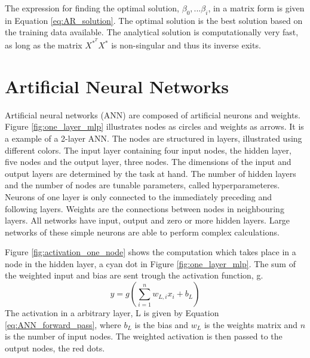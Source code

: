 \documentclass{article}
\begin{document}
The expression for finding the optimal solution, $\beta_0,...\beta_i$, in a matrix form is given in Equation \eqref{eq:AR_solution}. The optimal solution is the best solution based on the training data available. The analytical solution is computationally very fast, as long as the matrix $X^*^TX^*$ is non-singular and thus its inverse exits.

\section{Artificial Neural Networks} \label{sec:artificial neural networks}

Artificial neural networks (ANN) are composed of artificial neurons and weights. Figure \ref{fig:one_layer_mlp} illustrates nodes as circles and weights as arrows. It is a example of a 2-layer ANN. The nodes are structured in layers, illustrated using different colors. The input layer containing four input nodes, the hidden layer, five nodes and the output layer, three nodes. The dimensions of the input and output layers are determined by the task at hand. The number of hidden layers and the number of nodes are tunable parameters, called hyperparameteres. Neurons of one layer is only connected to the immediately preceding and following layers. Weights are the connections between nodes in neighbouring layers. All networks have input, output and zero or more hidden layers. Large networks of these simple neurons are able to perform complex calculations. 

Figure \ref{fig:activation_one_node} shows the computation which takes place in a node in the hidden layer, a cyan dot in Figure \ref{fig:one_layer_mlp}. The sum of the weighted input and bias are sent trough the activation function, g. 
\begin{equation} \label{eq:ANN_forward_pass}
    y = g(\sum_{i=1}^n w_{L, i} x_i + b_L)
\end{equation}
The activation in a arbitrary layer, L is given by Equation \eqref{eq:ANN_forward_pass}, where $b_L$ is the bias and $w_L$ is the weights matrix and $n$ is the number of input nodes. The weighted activation is then passed to the output nodes, the red dots. 
\end{document}
